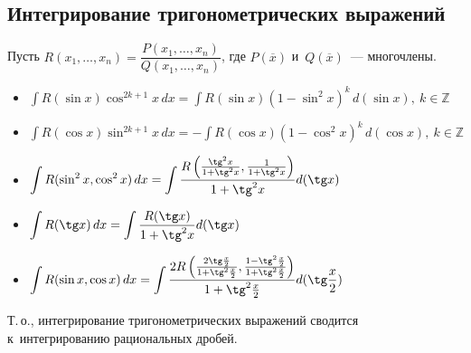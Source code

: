 \subsection{Интегрирование тригонометрических выражений}
Пусть $R(x_1, \ldots, x_n) = \dfrac{P(x_1, \ldots, x_n)}{Q(x_1, \ldots, x_n)}$, где $P(\overline x)$ и~$Q(\overline x)$~--- многочлены.
\begin{itemize}
	\item $\int R(\sin x) \cos^{2k+1} x\,dx = \int R(\sin x) (1 - \sin^2 x)^k\,d(\sin x), \ k \in \mathbb Z$
	
	\item $\int R(\cos x) \sin^{2k+1} x\,dx = -\int R(\cos x) (1 - \cos^2 x)^k\,d(\cos x), \ k \in \mathbb Z$
	
	\item $\displaystyle \int R(\sin^2 x, \cos^2 x)\,dx = \int \frac
	{R\left( \frac{\tg^2 x}{1 + \tg^2 x}, \frac1{1 + \tg^2 x} \right)}
	{1 + \tg^2 x} d(\tg x)$
	
	\item $\displaystyle \int R(\tg x)\,dx = \int \frac{R(\tg x)}{1 + \tg^2 x} d(\tg x)$
	
	\item $\displaystyle \int R(\sin x, \cos x)\,dx = \int \frac
	{2R\left( \frac{2\tg \frac{x}2}{1 + \tg^2 \frac{x}2}, \frac{1 - \tg^2 \frac{x}2}{1 + \tg^2 \frac{x}2} \right)}
	{1 + \tg^2 \frac{x}2} d(\tg \frac{x}2)$
\end{itemize}

Т.\,о., интегрирование тригонометрических выражений сводится к~интегрированию рациональных дробей.